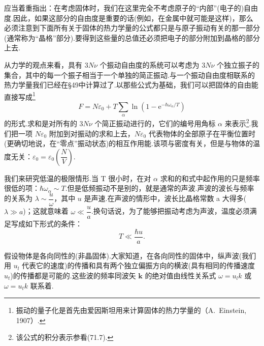 应当着重指出：在考虑固体时，我们在这里完全不考虑原子的“内部”(电子的)自由度.因此，如果这部分的自由度是重要的话(例如，在金属中就可能是这样)，那么必须注意到下面所有关于固体的热力学量的公式都只是与原子振动有关的那一部分(通常称为“晶格”部分).要得到这些量的总值还必须把电子的部分附加到晶格的部分上去.

从力学的观点来看，具有 $3N\nu$ 个振动自由度的系统可以考虑为 $3N\nu$ 个独立振子的集合，其中的每一个振子相当于一个单独的简正振动.与一个振动自由度相联系的热力学量我们已经在§49中计算过了.以那些公式为基础，我们可以把固体的自由能直接写成\footnote{振动的量子化是首先由爱因斯坦用来计算固体的热力学量的（A.~Einstein, 1907）.}
\begin{equation}
  F=N\varepsilon_0+T\sum_\alpha\ln\left(1-\mathrm{e}^{-\hbar\omega_\alpha/T}\right)
\end{equation}
的形式.求和是对所有的 $3N\nu$ 个简正振动进行的，它们的编号用角标 $\alpha$ 来表示\footnote{该公式的积分表示参看(71.7).}.我们把一项 $N\varepsilon_0$ 附加到对振动的求和上去，$N\varepsilon_0$ 代表物体的全部原子在平衡位置时(更确切地说，在“零点”振动状态)的相互作用能.该项与密度有关，但是与物体的温度无关：$\varepsilon_0=\varepsilon_0\left(\dfrac{N}{V}\right)$.

我们来研究低温的极限情形.当 T 很小时，在对 $\alpha$ 求和的和式中起作用的只是频率很低的项：$\hbar\omega_\alpha\sim T$.但是低频振动不是别的，就是通常的声波.声波的波长与频率的关系为 $\lambda\sim\dfrac{u}{\omega}$，其中 $u$ 是声速.在声波的情形中，波长比晶格常数 a 大得多($\lambda\gg a$)；这就意味着 $\omega\ll\dfrac{u}{a}$.换句话说，为了能够把振动考虑为声波，温度必须满足写成如下形式的条件：
\begin{equation}
  T\ll\frac{\hbar u}{a}.
\end{equation}

假设物体是各向同性的(非晶固体).大家知道，在各向同性的固体中，纵声波(我们用 $u_l$ 代表它的速度)的传播和具有两个独立偏振方向的横波(具有相同的传播速度 $u_t$)的传播都是可能的.这些波的频率同波矢 $\boldsymbol{k}$ 的绝对值由线性关系式 $\omega=u_lk$ 或 $\omega=u_tk$ 联系着.

